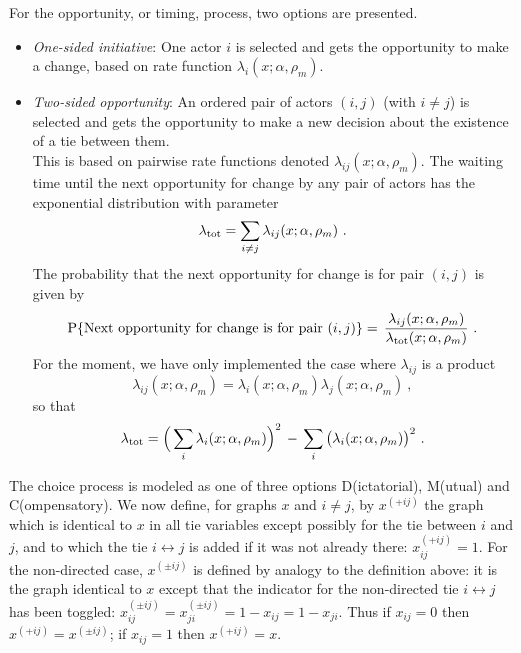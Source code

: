 \documentclass[a4paper,12pt,fleqn]{article}
\renewcommand{\P}{\mbox{P}}
\begin{document}
For the opportunity, or timing, process, two options are presented.
\begin{itemize}
\item[1.] \emph{One-sided initiative}:
          One actor $i$ is selected and gets the opportunity to make a change,
          based on rate function $\lambda_{i}(x; \alpha, \rho_m)$.
\item[2.] \emph{Two-sided opportunity}:
          An ordered pair of actors $(i,j)$ (with $i \neq j$) is selected
          and gets the opportunity
          to make a new decision about the existence of a tie between them.\\
          This is based on pairwise rate functions
          denoted $\lambda_{ij}(x; \alpha, \rho_m)$.
          The waiting time until the next opportunity for change
          by any pair of actors has the exponential
          distribution
          with parameter
          \[\lambda_{\rm{tot}} = \sum_{i \neq j} \lambda_{ij}(x; \alpha, \rho_m) \ .
          \]
          The probability that the next opportunity for change is for pair $(i,j)$ is given by
          \begin{equation}
           \P\{ \text{Next opportunity for change is for pair } (i, j) \} = \,
            \frac{\lambda_{ij}(x; \alpha, \rho_m)}{\lambda_{\rm{tot}}(x; \alpha, \rho_m)} \ .
          \end{equation}
          For the moment, we have only implemented the case where $\lambda_{ij}$ is a product
          \[
          \lambda_{ij}(x; \alpha, \rho_m) = \lambda_{i}(x; \alpha, \rho_m) \lambda_{j}(x; \alpha, \rho_m) \ ,
          \]
          so that
          \begin{equation}
           \lambda_{\rm{tot}} = \Big( \sum_{i} \lambda_{i}(x; \alpha, \rho_m)\Big)^2
                         \, - \,  \sum_{i} \big(\lambda_{i}(x; \alpha, \rho_m)\big)^2 \ .
          \end{equation}
\end{itemize}

The choice process is modeled as one of three options
D(ictatorial), M(utual) and C(ompensatory).
We now define, for graphs $x$ and $i \neq j$, by $x^{(+ij)}$ the graph
which is identical to $x$ in all tie variables except possibly
for the tie between $i$ and $j$,
and to which the tie $i \leftrightarrow j$
is added if it was not already there:
$x^{(+ij)}_{ij} = 1$.
For the non-directed case, $x^{(\pm ij)}$ is defined
by analogy to the definition above:
it is the graph identical to $x$
except that the indicator for the non-directed
tie $i \leftrightarrow j$ has been toggled:
$x^{(\pm ij)}_{ij} = x^{(\pm ij)}_{ji} = 1 - x_{ij} = 1 - x_{ji}$.
Thus if $x_{ij} = 0$ then $x^{(+ ij)} = x^{(\pm ij)}$;
if $x_{ij} = 1$ then $x^{(+ ij)} = x$.
\end{document}
